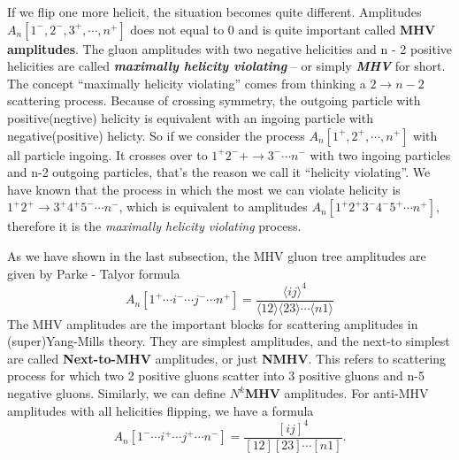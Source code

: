 \documentclass[12pt]{article}
\numberwithin{equation}{section}
\newcommand{\mdavg}[2]{\langle #1 \rangle\!\langle #2 \rangle}
\newcommand{\avg}[1]{\langle #1 \rangle}
\newcommand{\tif}[1]{\textit{\textbf{#1}}}
\begin{document}
If we flip one more helicit, the situation becomes quite different. Amplitudes $A_n[1^-,2^-,3^+,\cdots,n^+]$ does not equal to 0 and is quite important called \textbf{MHV amplitudes}.
The gluon amplitudes with two negative helicities and n - 2 positive helicities are called
\tif{maximally helicity violating} – or simply \tif{MHV} for short. The concept ``maximally helicity violating'' comes from thinking a $2\rightarrow n-2$ scattering process. 
Because of crossing symmetry, the outgoing particle with positive(negtive) helicity is equivalent with an ingoing particle with negative(positive) helicty. So if we consider the process $A_n[1^+,2^+,\cdots,n^+]$ with 
all particle ingoing. It crosses over to $1^+2^-+\rightarrow 3^-\cdots n^-$ with two ingoing particles and n-2 outgoing particles, that's the reason we call it ``helicity violating''. We have known that the process in which the most we can violate helicity
is $1^+2^+\rightarrow 3^+4^+5^-\cdots n^-$, which is equivalent to amplitudes $A_n[1^+2^+3^-4^-5^+\cdots n^+]$, therefore it is the \textit{maximally helicity violating} process.

As we have shown in the last subsection, the MHV gluon tree amplitudes are given by Parke - Talyor formula
\begin{equation}
    A_n[1^+\cdots i^-\cdots j^- \cdots n^+]=\frac{\avg{ij}^4}{\mdavg{12}{23}\cdots\avg{n1}}
\end{equation}
The MHV amplitudes are the important blocks for scattering amplitudes in (super)Yang-Mills theory. They are simplest amplitudes, and the next-to simplest
are called \textbf{Next-to-MHV} amplitudes, or just \textbf{NMHV}. This refers to scattering process for which two 2 positive gluons scatter into 3 positive gluons and n-5 negative gluons. 
Similarly, we can define \textbf{$N^k$MHV} amplitudes. For anti-MHV amplitudes with all helicities flipping, we have a formula
\begin{equation}
    A_n[1^-\cdots i^+\cdots j^+ \cdots n^-]=\frac{[ij]^4}{[12][23]\cdots[n1]}.
\end{equation}
\end{document}
